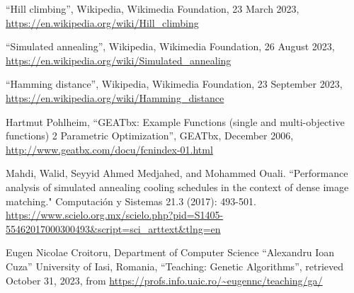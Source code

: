 \documentclass{article}
\begin{document}
\begin{thebibliography}{9}

``Hill climbing'', Wikipedia, Wikimedia Foundation, 23 March 2023, \url{https://en.wikipedia.org/wiki/Hill\_climbing}

``Simulated annealing'', Wikipedia, Wikimedia Foundation, 26 August 2023, \url{https://en.wikipedia.org/wiki/Simulated\_annealing}

``Hamming distance'', Wikipedia, Wikimedia Foundation, 23 September 2023, \url{https://en.wikipedia.org/wiki/Hamming\_distance}

Hartmut Pohlheim, ``GEATbx: Example Functions (single and multi-objective functions) 2 Parametric Optimization'', GEATbx, December 2006, \url{http://www.geatbx.com/docu/fcnindex-01.html}

Mahdi, Walid, Seyyid Ahmed Medjahed, and Mohammed Ouali. ``Performance analysis of simulated annealing cooling schedules in the context of dense image matching." Computación y Sistemas 21.3 (2017): 493-501. \url{https://www.scielo.org.mx/scielo.php?pid=S1405-55462017000300493&script=sci_arttext&tlng=en}

Eugen Nicolae Croitoru, Department of Computer Science ``Alexandru Ioan Cuza'' University of Iasi, Romania, ``Teaching: Genetic Algorithms'', retrieved October 31, 2023, from \url{https://profs.info.uaic.ro/~eugennc/teaching/ga/}

\end{thebibliography}
\end{document}
